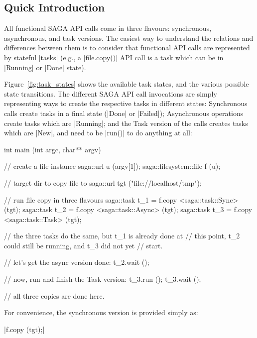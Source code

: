
 \subsection{Quick Introduction}

  All functional SAGA API calls come in three flavours:
  synchronous, asynchronous, and task versions.  The easiest way to
  understand the relations and differences between them is to
  consider that  functional API calls are represented by
  stateful |tasks| (e.g., a |file.copy()| API call is a task which
  can be in |Running| or |Done| state).


  Figure~\ref{fig:task_states} shows the available task states, and the various possible state transitions.  The different
  SAGA API call invocations are simply representing ways to create the
  respective tasks in different states: Synchronous calls create tasks
  in a final state (|Done| or |Failed|); Asynchronous operations
  create tasks which are |Running|; and the Task version of the calls
  creates tasks which are |New|, and need to be |run()| to do anything
  at all:


  \begin{mycode}[label=Asynchronous operations]
  int main (int argc, char** argv)
  {
    // create a file instance
    saga::url u (argv[1]);
    saga::filesystem::file f (u);

    // target dir to copy file to
    saga::url tgt ("file://localhost/tmp");

    // run file copy in three flavours
    saga::task t_1 = f.copy <saga::task::Sync>  (tgt);
    saga::task t_2 = f.copy <saga::task::Async> (tgt);
    saga::task t_3 = f.copy <saga::task::Task>  (tgt);

    // the three tasks do the same, but t_1 is already done at
    // this point, t_2 could still be running, and t_3 did not yet
    // start.

    // let's get the async version done:
    t_2.wait ();

    // now, run and finish the Task version:
    t_3.run ();
    t_3.wait ();

    // all three copies are done here.
  }
  \end{mycode}

  For convenience, the synchronous version is provided simply as:

   \shift |f.copy (tgt);|

